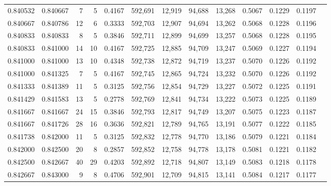 \begin{tabular}{rrrrrrrrrrrrr}
0.840532 & 0.840667 &     7 &   5 &                                     0.4167 & 592,691 &  12,919 &  94,688 &  13,268 & 0.5067 & 0.1229 & 0.1197 \\
0.840667 & 0.840786 &    12 &   6 &                                     0.3333 & 592,703 &  12,907 &  94,694 &  13,262 & 0.5068 & 0.1228 & 0.1196 \\
0.840833 & 0.840833 &     8 &   5 &                                     0.3846 & 592,711 &  12,899 &  94,699 &  13,257 & 0.5068 & 0.1228 & 0.1195 \\
0.840833 & 0.841000 &    14 &  10 &                                     0.4167 & 592,725 &  12,885 &  94,709 &  13,247 & 0.5069 & 0.1227 & 0.1194 \\
0.841000 & 0.841000 &    13 &  10 &                                     0.4348 & 592,738 &  12,872 &  94,719 &  13,237 & 0.5070 & 0.1226 & 0.1192 \\
0.841000 & 0.841325 &     7 &   5 &                                     0.4167 & 592,745 &  12,865 &  94,724 &  13,232 & 0.5070 & 0.1226 & 0.1192 \\
0.841333 & 0.841389 &    11 &   5 &                                     0.3125 & 592,756 &  12,854 &  94,729 &  13,227 & 0.5072 & 0.1225 & 0.1191 \\
0.841429 & 0.841583 &    13 &   5 &                                     0.2778 & 592,769 &  12,841 &  94,734 &  13,222 & 0.5073 & 0.1225 & 0.1189 \\
0.841667 & 0.841667 &    24 &  15 &                                     0.3846 & 592,793 &  12,817 &  94,749 &  13,207 & 0.5075 & 0.1223 & 0.1187 \\
0.841667 & 0.841726 &    28 &  16 &                                     0.3636 & 592,821 &  12,789 &  94,765 &  13,191 & 0.5077 & 0.1222 & 0.1185 \\
0.841738 & 0.842000 &    11 &   5 &                                     0.3125 & 592,832 &  12,778 &  94,770 &  13,186 & 0.5079 & 0.1221 & 0.1184 \\
0.842000 & 0.842500 &    20 &   8 &                                     0.2857 & 592,852 &  12,758 &  94,778 &  13,178 & 0.5081 & 0.1221 & 0.1182 \\
0.842500 & 0.842667 &    40 &  29 &                                     0.4203 & 592,892 &  12,718 &  94,807 &  13,149 & 0.5083 & 0.1218 & 0.1178 \\
0.842667 & 0.843000 &     9 &   8 &                                     0.4706 & 592,901 &  12,709 &  94,815 &  13,141 & 0.5084 & 0.1217 & 0.1177 \\

\end{tabular}
